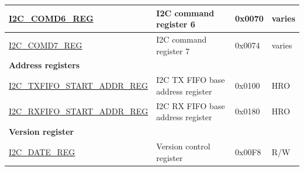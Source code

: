 \begin{longtable}{  | m{5.7cm} | m{7cm} | m{1.3cm} | m{1.5cm} | }
\hyperref[regdesc:I2CCOMD6REG]{I2C\_COMD6\_REG} & I2C command register 6 & 0x0070 & varies \\ \hline
\hyperref[regdesc:I2CCOMD7REG]{I2C\_COMD7\_REG} & I2C command register 7 & 0x0074 & varies \\ \hline
\multicolumn{4}{|l|}{\textbf{Address registers}} \\ \hline
\hyperref[regdesc:I2CTXFIFOSTARTADDRREG]{I2C\_TXFIFO\_START\_ADDR\_REG} & I2C TX FIFO base address register & 0x0100 & HRO \\ \hline
\hyperref[regdesc:I2CRXFIFOSTARTADDRREG]{I2C\_RXFIFO\_START\_ADDR\_REG} & I2C RX FIFO base address register & 0x0180 & HRO \\ \hline
\multicolumn{4}{|l|}{\textbf{Version register}} \\ \hline
\hyperref[regdesc:I2CDATEREG]{I2C\_DATE\_REG} & Version control register & 0x00F8 & R/W \\ \hline
\end{longtable}
